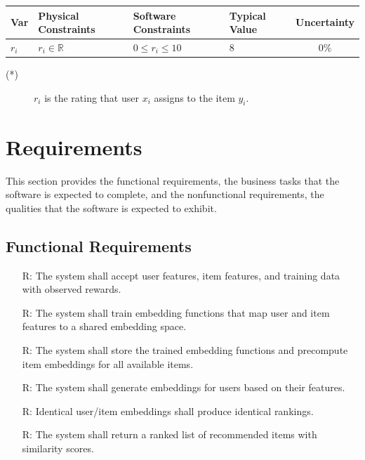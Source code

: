 \documentclass[12pt]{article}
\newcounter{reqnum} %
\begin{document}
\begin{table}[!h]
  \caption{Input Variables} \label{TblInputVar}
  \renewcommand{\arraystretch}{1.2}
\noindent \begin{longtable*}{l l l l c} 
  \toprule
  \textbf{Var} & \textbf{Physical Constraints} & \textbf{Software Constraints} &
                             \textbf{Typical Value} & \textbf{Uncertainty}\\
  \midrule 
  $r_i$ & $r_i \in \mathbb{R}$ & $0 \leq r_i \leq 10$ & 8  & 0\%
  \\
  \bottomrule
\end{longtable*}
\end{table}

\noindent 
\begin{description}
\item[(*)] $r_i$ is the rating that user $x_i$ assigns to the item $y_i$.
\end{description}


\section{Requirements}

This section provides the functional requirements, the business tasks that the
software is expected to complete, and the nonfunctional requirements, the
qualities that the software is expected to exhibit.

\subsection{Functional Requirements}

\noindent \begin{itemize}

\item[R\refstepcounter{reqnum}\thereqnum \label{R_TrainingInputs}:] The system shall accept user features, item features, and training data with observed rewards.

\item[R\refstepcounter{reqnum}\thereqnum \label{R_ModelTraining}:] The system shall train embedding functions that map user and item features to a shared embedding space.
  
\item[R\refstepcounter{reqnum}\thereqnum \label{R_ModelStorage}:] The system shall store the trained embedding functions and precompute item embeddings for all available items.
  
\item[R\refstepcounter{reqnum}\thereqnum \label{R_UserEmbedding}:] The system shall generate embeddings for users based on their features.

\item[R\refstepcounter{reqnum}\thereqnum \label{R_ConsistentRanking}:]
Identical user/item embeddings shall produce identical rankings.

\item[R\refstepcounter{reqnum}\thereqnum \label{R_Recommendations}:]  The system shall return a ranked list of recommended items with similarity scores.


\end{itemize}
\end{document}
